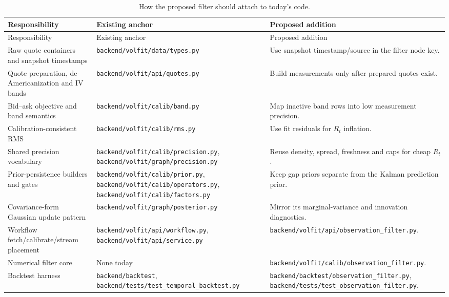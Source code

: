 \documentclass[11pt]{article}
\begin{document}
\begingroup
\small
\setlength{\tabcolsep}{3pt}
\begin{longtable}{@{}p{}p{}p{}@{}}
\caption{How the proposed filter should attach to today's code.}\\
\toprule
Responsibility & Existing anchor & Proposed addition\\
\midrule
\endfirsthead
\toprule Responsibility & Existing anchor & Proposed addition\\ \midrule
\endhead
Raw quote containers and snapshot timestamps &
\nolinkurl{backend/volfit/data/types.py} &
Use snapshot timestamp/source in the filter node key.\\
Quote preparation, de-Americanization and IV bands &
\nolinkurl{backend/volfit/api/quotes.py} &
Build measurements only after prepared quotes exist.\\
Bid--ask objective and band semantics &
\nolinkurl{backend/volfit/calib/band.py} &
Map inactive band rows into low measurement precision.\\
Calibration-consistent RMS &
\nolinkurl{backend/volfit/calib/rms.py} &
Use fit residuals for $R_t$ inflation.\\
Shared precision vocabulary &
\nolinkurl{backend/volfit/calib/precision.py},
\nolinkurl{backend/volfit/graph/precision.py} &
Reuse density, spread, freshness and caps for cheap $R_t$.\\
Prior-persistence builders and gates &
\nolinkurl{backend/volfit/calib/prior.py},
\nolinkurl{backend/volfit/calib/operators.py},
\nolinkurl{backend/volfit/calib/factors.py} &
Keep gap priors separate from the Kalman prediction prior.\\
Covariance-form Gaussian update pattern &
\nolinkurl{backend/volfit/graph/posterior.py} &
Mirror its marginal-variance and innovation diagnostics.\\
Workflow fetch/calibrate/stream placement &
\nolinkurl{backend/volfit/api/workflow.py},
\nolinkurl{backend/volfit/api/service.py} &
\nolinkurl{backend/volfit/api/observation_filter.py}.\\
Numerical filter core &
None today &
\nolinkurl{backend/volfit/calib/observation_filter.py}.\\
Backtest harness &
\nolinkurl{backend/backtest},
\nolinkurl{backend/tests/test_temporal_backtest.py} &
\nolinkurl{backend/backtest/observation_filter.py},
\nolinkurl{backend/tests/test_observation_filter.py}.\\
\bottomrule
\end{longtable}
\endgroup
\end{document}

